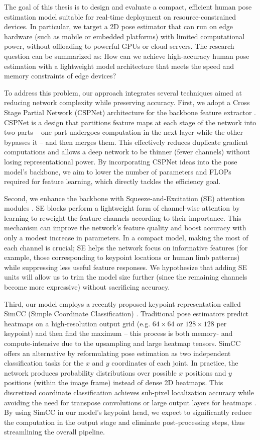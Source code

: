 The goal of this thesis is to design and evaluate a compact, efficient human pose estimation model suitable for real-time deployment on resource-constrained devices. In particular, we target a 2D pose estimator that can run on edge hardware (such as mobile or embedded platforms) with limited computational power, without offloading to powerful GPUs or cloud servers. The research question can be summarized as: How can we achieve high-accuracy human pose estimation with a lightweight model architecture that meets the speed and memory constraints of edge devices?

To address this problem, our approach integrates several techniques aimed at reducing network complexity while preserving accuracy. First, we adopt a Cross Stage Partial Network (CSPNet) architecture for the backbone feature extractor \citep{Wang2020CSPNet}. CSPNet is a design that partitions feature maps at each stage of the network into two parts – one part undergoes computation in the next layer while the other bypasses it – and then merges them. This effectively reduces duplicate gradient computations and allows a deep network to be thinner (fewer channels) without losing representational power. By incorporating CSPNet ideas into the pose model’s backbone, we aim to lower the number of parameters and FLOPs required for feature learning, which directly tackles the efficiency goal.

Second, we enhance the backbone with Squeeze-and-Excitation (SE) attention modules \citep{Hu2018SENet}. SE blocks perform a lightweight form of channel-wise attention by learning to reweight the feature channels according to their importance. This mechanism can improve the network’s feature quality and boost accuracy with only a modest increase in parameters. In a compact model, making the most of each channel is crucial; SE helps the network focus on informative features (for example, those corresponding to keypoint locations or human limb patterns) while suppressing less useful feature responses. We hypothesize that adding SE units will allow us to trim the model size further (since the remaining channels become more expressive) without sacrificing accuracy.

Third, our model employs a recently proposed keypoint representation called SimCC (Simple Coordinate Classification) \citep{Li2022SimCC}. Traditional pose estimators predict heatmaps on a high-resolution output grid (e.g. $64\times64$ or $128\times128$ per keypoint) and then find the maximum – this process is both memory- and compute-intensive due to the upsampling and large heatmap tensors. SimCC offers an alternative by reformulating pose estimation as two independent classification tasks for the $x$ and $y$ coordinates of each joint. In practice, the network produces probability distributions over possible $x$ positions and $y$ positions (within the image frame) instead of dense 2D heatmaps. This discretized coordinate classification achieves sub-pixel localization accuracy while avoiding the need for transpose convolutions or large output layers for heatmaps \citep{Li2022SimCC}. By using SimCC in our model’s keypoint head, we expect to significantly reduce the computation in the output stage and eliminate post-processing steps, thus streamlining the overall pipeline.

